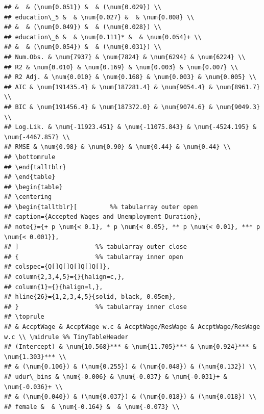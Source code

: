 \documentclass[
]{article}
\begin{document}
\begin{verbatim}
## &  & (\num{0.051}) &  & (\num{0.029}) \\
## education\_5 &  & \num{0.027} &  & \num{0.008} \\
## &  & (\num{0.049}) &  & (\num{0.028}) \\
## education\_6 &  & \num{0.111}* &  & \num{0.054}+ \\
## &  & (\num{0.054}) &  & (\num{0.031}) \\
## Num.Obs. & \num{7937} & \num{7824} & \num{6294} & \num{6224} \\
## R2 & \num{0.010} & \num{0.169} & \num{0.003} & \num{0.007} \\
## R2 Adj. & \num{0.010} & \num{0.168} & \num{0.003} & \num{0.005} \\
## AIC & \num{191435.4} & \num{187281.4} & \num{9054.4} & \num{8961.7} \\
## BIC & \num{191456.4} & \num{187372.0} & \num{9074.6} & \num{9049.3} \\
## Log.Lik. & \num{-11923.451} & \num{-11075.843} & \num{-4524.195} & \num{-4467.857} \\
## RMSE & \num{0.98} & \num{0.90} & \num{0.44} & \num{0.44} \\
## \bottomrule
## \end{talltblr}
## \end{table} 
## \begin{table}
## \centering
## \begin{talltblr}[         %% tabularray outer open
## caption={Accepted Wages and Unemployment Duration},
## note{}={+ p \num{< 0.1}, * p \num{< 0.05}, ** p \num{< 0.01}, *** p \num{< 0.001}},
## ]                     %% tabularray outer close
## {                     %% tabularray inner open
## colspec={Q[]Q[]Q[]Q[]Q[]},
## column{2,3,4,5}={}{halign=c,},
## column{1}={}{halign=l,},
## hline{26}={1,2,3,4,5}{solid, black, 0.05em},
## }                     %% tabularray inner close
## \toprule
## & AccptWage & AccptWage w.c & AccptWage/ResWage & AccptWage/ResWage w.c \\ \midrule %% TinyTableHeader
## (Intercept) & \num{10.568}*** & \num{11.705}*** & \num{0.924}*** & \num{1.303}*** \\
## & (\num{0.106}) & (\num{0.255}) & (\num{0.048}) & (\num{0.132}) \\
## udur\_bins & \num{-0.006} & \num{-0.037} & \num{-0.031}+ & \num{-0.036}+ \\
## & (\num{0.040}) & (\num{0.037}) & (\num{0.018}) & (\num{0.018}) \\
## female &  & \num{-0.164} &  & \num{-0.073} \\

\end{verbatim}
\end{document}
